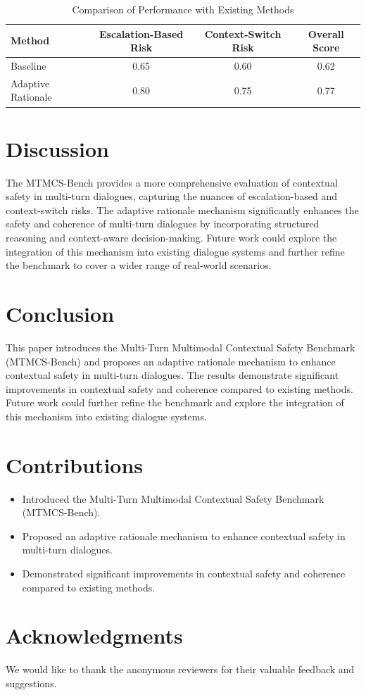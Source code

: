 \documentclass{article}
\begin{document}
\begin{table}[htbp]
\centering
\caption{Comparison of Performance with Existing Methods}
\label{tab:rationale_results}
\begin{tabular}{|l|c|c|c|}
\hline
\textbf{Method} & \textbf{Escalation-Based Risk} & \textbf{Context-Switch Risk} & \textbf{Overall Score} \\
\hline
Baseline & 0.65 & 0.60 & 0.62 \\
Adaptive Rationale & 0.80 & 0.75 & 0.77 \\
\hline
\end{tabular}
\end{table}

\section{Discussion}
The MTMCS-Bench provides a more comprehensive evaluation of contextual safety in multi-turn dialogues, capturing the nuances of escalation-based and context-switch risks. The adaptive rationale mechanism significantly enhances the safety and coherence of multi-turn dialogues by incorporating structured reasoning and context-aware decision-making. Future work could explore the integration of this mechanism into existing dialogue systems and further refine the benchmark to cover a wider range of real-world scenarios.

\section{Conclusion}
This paper introduces the Multi-Turn Multimodal Contextual Safety Benchmark (MTMCS-Bench) and proposes an adaptive rationale mechanism to enhance contextual safety in multi-turn dialogues. The results demonstrate significant improvements in contextual safety and coherence compared to existing methods. Future work could further refine the benchmark and explore the integration of this mechanism into existing dialogue systems.

\section{Contributions}
\begin{itemize}
    \item Introduced the Multi-Turn Multimodal Contextual Safety Benchmark (MTMCS-Bench).
    \item Proposed an adaptive rationale mechanism to enhance contextual safety in multi-turn dialogues.
    \item Demonstrated significant improvements in contextual safety and coherence compared to existing methods.
\end{itemize}

\section*{Acknowledgments}
We would like to thank the anonymous reviewers for their valuable feedback and suggestions.



\end{document}
